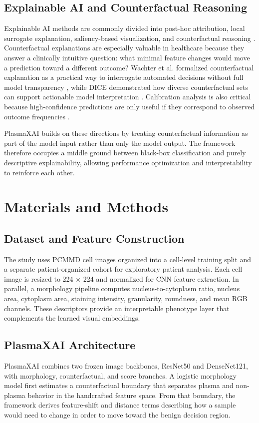 \documentclass[runningheads]{llncs}
\begin{document}
\subsection{Explainable AI and Counterfactual Reasoning}
Explainable AI methods are commonly divided into post-hoc attribution, local surrogate explanation, saliency-based visualization, and counterfactual reasoning \cite{lime,gradcam,shap,wachter}. Counterfactual explanations are especially valuable in healthcare because they answer a clinically intuitive question: what minimal feature changes would move a prediction toward a different outcome? Wachter et al. formalized counterfactual explanation as a practical way to interrogate automated decisions without full model transparency \cite{wachter}, while DICE demonstrated how diverse counterfactual sets can support actionable model interpretation \cite{diceml}. Calibration analysis is also critical because high-confidence predictions are only useful if they correspond to observed outcome frequencies \cite{calibration}.

PlasmaXAI builds on these directions by treating counterfactual information as part of the model input rather than only the model output. The framework therefore occupies a middle ground between black-box classification and purely descriptive explainability, allowing performance optimization and interpretability to reinforce each other.

\section{Materials and Methods}
\subsection{Dataset and Feature Construction}
The study uses PCMMD cell images organized into a cell-level training split and a separate patient-organized cohort for exploratory patient analysis. Each cell image is resized to 224 $\times$ 224 and normalized for CNN feature extraction. In parallel, a morphology pipeline computes nucleus-to-cytoplasm ratio, nucleus area, cytoplasm area, staining intensity, granularity, roundness, and mean RGB channels. These descriptors provide an interpretable phenotype layer that complements the learned visual embeddings.

\subsection{PlasmaXAI Architecture}
PlasmaXAI combines two frozen image backbones, ResNet50 and DenseNet121, with morphology, counterfactual, and score branches. A logistic morphology model first estimates a counterfactual boundary that separates plasma and non-plasma behavior in the handcrafted feature space. From that boundary, the framework derives feature-shift and distance terms describing how a sample would need to change in order to move toward the benign decision region.
\end{document}
